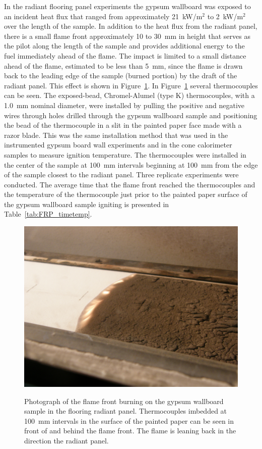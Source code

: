 \documentclass[twoside]{uocthesis}
\begin{document}
In the radiant flooring panel experiments the gypsum wallboard was exposed to an incident heat flux that ranged from approximately 21~kW/m$^2$ to 2~kW/m$^2$ over the length of the sample. In addition to the heat flux from the radiant panel, there is a small flame front approximately 10 to 30~mm in height that serves as the pilot along the length of the sample and provides additional energy to the fuel immediately ahead of the flame.  The impact is limited to a small distance ahead of the flame, estimated to be less than 5~mm, since the flame is drawn back to the leading edge of the sample (burned portion) by the draft of the radiant panel.  This effect is shown in Figure~\ref{FRP_flamefront}. In Figure~\ref{FRP_flamefront} several thermocouples can be seen. The exposed-bead, Chromel-Alumel (type K) thermocouples, with a 1.0~mm nominal diameter, were installed by pulling the positive and negative wires through holes drilled through the gypsum wallboard sample and positioning the bead of the thermocouple in a slit in the painted paper face made with a razor blade.  This was the same installation method that was used in the instrumented gypsum board wall experiments and in the cone calorimeter samples to measure ignition temperature.  The thermocouples were installed in the center of the sample at 100~mm intervals beginning at 100~mm from the edge of the sample closest to the radiant panel.  Three replicate experiments were conducted.  The average time that the flame front reached the thermocouples and the temperature of the thermocouple just prior to the painted paper surface of the gypsum wallboard sample igniting is presented in Table~\ref{tab:FRP_timetemp}.  

\begin{figure}
	\centering
	\includegraphics[width=\textwidth]{../Figures/FRP_flamefront} \\
	\caption[Photograph of the flame front burning on the gypsum wallboard sample in the flooring radiant panel] {Photograph of the flame front burning on the gypsum wallboard sample in the flooring radiant panel. Thermocouples imbedded at 100~mm intervals in the surface of the painted paper can be seen in front of and behind the flame front. The flame is leaning back in the direction the radiant panel.}
	\label{FRP_flamefront}
\end{figure}
\end{document}
